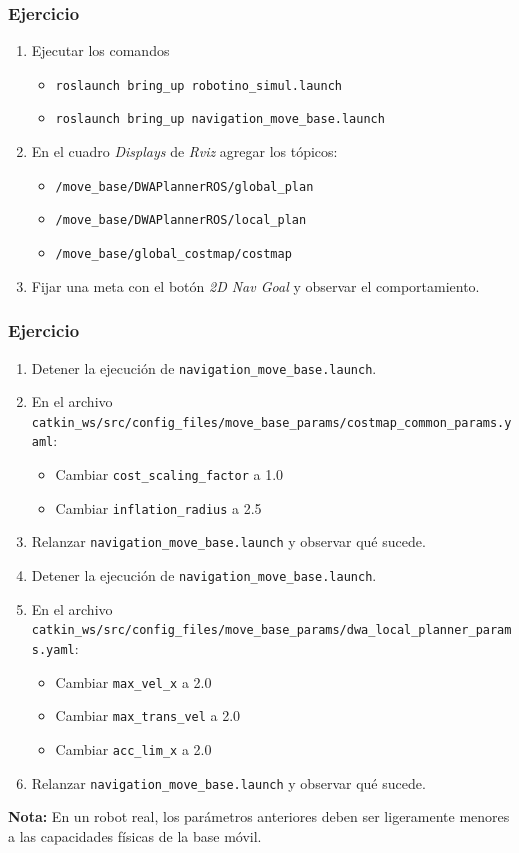 \documentclass[10pt,spanish,aspectratio=1610]{beamer}
\begin{document}
\begin{frame}\frametitle{Ejercicio}
  \begin{enumerate}
  \item Ejecutar los comandos
    \begin{itemize}
    \item \texttt{roslaunch bring\_up robotino\_simul.launch}
    \item \texttt{roslaunch bring\_up navigation\_move\_base.launch}
    \end{itemize}
  \item En el cuadro \textit{Displays} de \textit{Rviz} agregar los tópicos:
    \begin{itemize}
    \item \texttt{/move\_base/DWAPlannerROS/global\_plan}
    \item \texttt{/move\_base/DWAPlannerROS/local\_plan}
    \item \texttt{/move\_base/global\_costmap/costmap}
    \end{itemize}
    \item Fijar una meta con el botón \textit{2D Nav Goal} y observar el comportamiento.
  \end{enumerate}
\end{frame}

\begin{frame}\frametitle{Ejercicio}
  \begin{enumerate}
  \item Detener la ejecución de \texttt{navigation\_move\_base.launch}.
  \item En el archivo \texttt{catkin\_ws/src/config\_files/move\_base\_params/costmap\_common\_params.yaml}:
    \begin{itemize}
    \item Cambiar \texttt{cost\_scaling\_factor} a 1.0
    \item Cambiar \texttt{inflation\_radius} a 2.5
    \end{itemize}
  \item Relanzar \texttt{navigation\_move\_base.launch} y observar qué sucede.
  \item Detener la ejecución de \texttt{navigation\_move\_base.launch}.
  \item En el archivo \texttt{catkin\_ws/src/config\_files/move\_base\_params/dwa\_local\_planner\_params.yaml}:
    \begin{itemize}
    \item Cambiar \texttt{max\_vel\_x} a 2.0
    \item Cambiar \texttt{max\_trans\_vel} a 2.0
    \item Cambiar \texttt{acc\_lim\_x} a 2.0
    \end{itemize}
  \item Relanzar \texttt{navigation\_move\_base.launch} y observar qué sucede.
  \end{enumerate}
  \textbf{Nota:} En un robot real, los parámetros anteriores deben ser ligeramente menores a las capacidades físicas de la base móvil. 
\end{frame}
\end{document}
